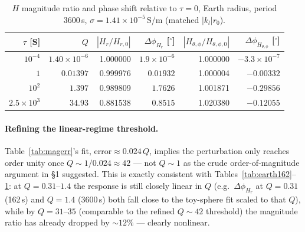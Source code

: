 \documentclass[11pt]{article}
\begin{document}
\begin{table}[h]
\centering
\begin{tabular}{rr rr rr}
\toprule
$\tau$ [S] & $Q$ & $|H_r/H_{r,0}|$ & $\Delta\phi_{H_r}$ [$^\circ$]
           & $|H_{\theta,\phi}/H_{\theta,\phi,0}|$ & $\Delta\phi_{H_{\theta,\phi}}$ [$^\circ$] \\
\midrule
$10^{-4}$         & $1.40\times10^{-6}$ & 1.000000 & $1.9\times10^{-6}$ & 1.000000 & $-3.3\times10^{-7}$ \\
$1$               & $0.01397$           & 0.999976 & $0.01932$          & 1.000004 & $-0.00332$ \\
$10^{2}$          & $1.397$             & 0.989809 & $1.7626$           & 1.001871 & $-0.29856$ \\
$2.5\times10^{3}$ & $34.93$             & 0.881538 & $0.8515$           & 1.020380 & $-0.12055$ \\
\bottomrule
\end{tabular}
\caption{$H$ magnitude ratio and phase shift relative to $\tau=0$, Earth radius, period 3600\,s,
$\sigma=1.41\times10^{-5}$\,S/m (matched $|k_l|r_0$).}
\label{tab:earth3600}
\end{table}

\paragraph{Refining the linear-regime threshold.} Table~\ref{tab:magerr}'s fit, $\text{error}\approx
0.024\,Q$, implies the perturbation only reaches order unity once $Q\sim1/0.024\approx42$ --- not
$Q\sim1$ as the crude order-of-magnitude argument in \S1 suggested. This is exactly consistent with
Tables~\ref{tab:earth162}--\ref{tab:earth3600}: at $Q=0.31$--$1.4$ the response is still closely
linear in $Q$ (e.g.\ $\Delta\phi_{H_r}$ at $Q=0.31$ (162\,s) and $Q=1.4$ (3600\,s) both fall
close to the toy-sphere fit scaled to that $Q$), while by $Q=31$--$35$ (comparable to the refined
$Q\sim42$ threshold) the magnitude ratio has already dropped by ${\sim}12\%$ --- clearly nonlinear.
\end{document}
